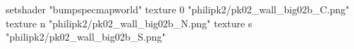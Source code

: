 setshader "bumpspecmapworld"
    texture 0 "philipk2/pk02_wall_big02b_C.png"
    texture n "philipk2/pk02_wall_big02b_N.png"
    texture s "philipk2/pk02_wall_big02b_S.png"